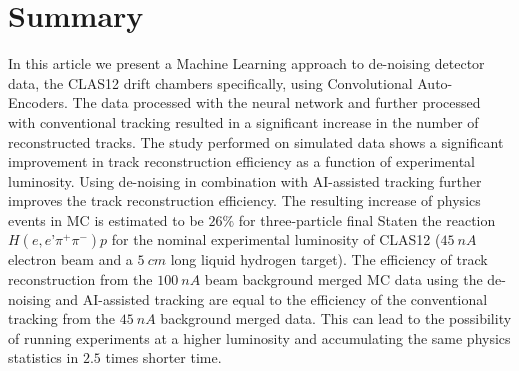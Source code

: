 

\section{Summary}

In this article we present a Machine Learning approach to de-noising detector data, the CLAS12 drift chambers specifically, using Convolutional Auto-Encoders. The data processed with the neural network and further processed with conventional tracking resulted in a significant increase in the number of reconstructed tracks. The study performed on simulated data shows a significant improvement in track reconstruction efficiency as a function of experimental luminosity. Using de-noising in combination with AI-assisted tracking further improves the track reconstruction efficiency. 
The resulting increase of physics events in MC is estimated to be $26\%$ for three-particle final Staten the reaction 
$H(e,e’\pi^+\pi^-)p$ for the nominal experimental luminosity of CLAS12 ($45~nA$ electron beam and a $5~cm$ long 
liquid hydrogen target). The efficiency of track reconstruction from the $100~nA$ beam background merged MC data using the 
de-noising and AI-assisted tracking are equal to the efficiency of the conventional tracking from the $45~nA$ background merged data.
This can lead to the possibility of running experiments at a higher luminosity and accumulating the same physics statistics in $2.5$ times shorter time.


